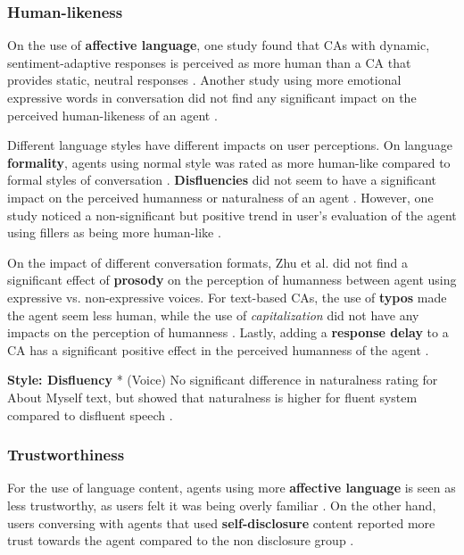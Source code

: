 \documentclass[sigconf,screen,review, anonymous]{acmart}
\newcommand{\cmt}[1]{}%
\begin{document}
\subsubsection{Human-likeness}

On the use of \textbf{affective language}, one study found that CAs with dynamic, sentiment-adaptive responses is perceived as more human than a CA that provides static, neutral responses \cite{diederich2019emulating}\cmt{[25]}. Another study using more emotional expressive words in conversation did not find any significant impact on the perceived human-likeness of an agent \cite{zhu2022effects}\cmt{[26]}.

Different language styles have different impacts on user perceptions. On language \textbf{formality}, agents using normal style was rated as more human-like compared to formal styles of conversation \cite{ouchi2019should}\cmt{[59]}. \textbf{Disfluencies} did not seem to have a significant impact on the perceived humanness or naturalness of an agent \cite{jeong2019exploring}\cmt{[10]}\cite{pfeifer2009should}\cmt{[12]}. However, one study noticed a non-significant but positive trend in user's evaluation of the agent using fillers as being more human-like \cite{jeong2019exploring}\cmt{[10]}.

On the impact of different conversation formats, Zhu et al. did not find a significant effect of \textbf{prosody} on the perception of humanness between agent using expressive vs. non-expressive voices. For text-based CAs, the use of \textbf{typos} made the agent seem less human, while the use of \textit{capitalization} did not have any impacts on the perception of humanness \cite{westerman2019believe}\cmt{[9]}. Lastly, adding a \textbf{response delay} to a CA has a significant positive effect in the perceived humanness of the agent \cite{gnewuch2018faster}\cmt{[19]}. 


\textbf{Style: Disfluency}
* (Voice) No significant difference in naturalness rating for About Myself text, but showed that naturalness is higher for fluent system compared to disfluent speech \cite{wester2015artificial}\cmt{[14]}.



\subsubsection{Trustworthiness}

For the use of language content, agents using more \textbf{affective language} is seen as less trustworthy, as users felt it was being overly familiar \cite{andrews2012system}\cmt{[38]}. On the other hand, users conversing with agents that used \textbf{self-disclosure} content reported more trust towards the agent compared to the non disclosure group \cite{lee2020hear}\cmt{[23]}.
\end{document}
